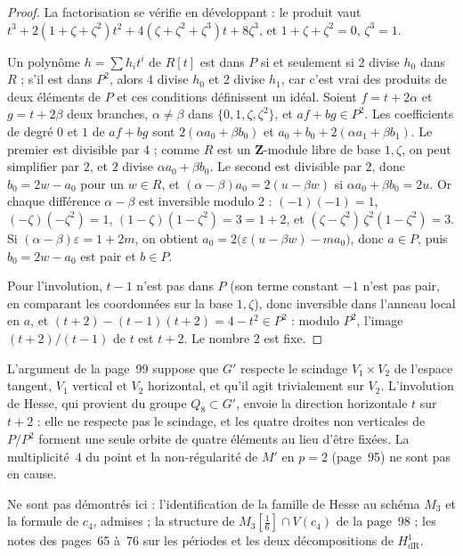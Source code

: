 \begin{proof}
La factorisation se vérifie en développant : le produit vaut $t^3 + 2(1 + \zeta + \zeta^2)t^2 + 4(\zeta + \zeta^2 + \zeta^3)t + 8\zeta^3$, et $1 + \zeta + \zeta^2 = 0$, $\zeta^3 = 1$.

Un polynôme $h = \sum h_i t^i$ de $R[t]$ est dans $P$ si et seulement si $2$ divise $h_0$ dans $R$ ; s'il est dans $P^2$, alors $4$ divise $h_0$ et $2$ divise $h_1$, car c'est vrai des produits de deux éléments de $P$ et ces conditions définissent un idéal. Soient $f = t + 2\alpha$ et $g = t + 2\beta$ deux branches, $\alpha \neq \beta$ dans $\{0, 1, \zeta, \zeta^2\}$, et $af + bg \in P^2$. Les coefficients de degré $0$ et $1$ de $af + bg$ sont $2(\alpha a_0 + \beta b_0)$ et $a_0 + b_0 + 2(\alpha a_1 + \beta b_1)$. Le premier est divisible par $4$ ; comme $R$ est un $\mathbf Z$-module libre de base $1, \zeta$, on peut simplifier par $2$, et $2$ divise $\alpha a_0 + \beta b_0$. Le second est divisible par $2$, donc $b_0 = 2w - a_0$ pour un $w \in R$, et $(\alpha - \beta) a_0 = 2(u - \beta w)$ si $\alpha a_0 + \beta b_0 = 2u$. Or chaque différence $\alpha - \beta$ est inversible modulo $2$ : $(-1)(-1) = 1$, $(-\zeta)(-\zeta^2) = 1$, $(1 - \zeta)(1 - \zeta^2) = 3 = 1 + 2$, et $(\zeta - \zeta^2)\,\zeta^2(1 - \zeta^2) = 3$. Si $(\alpha - \beta)\varepsilon = 1 + 2m$, on obtient $a_0 = 2\bigl(\varepsilon(u - \beta w) - m a_0\bigr)$, donc $a \in P$, puis $b_0 = 2w - a_0$ est pair et $b \in P$.

Pour l'involution, $t - 1$ n'est pas dans $P$ (son terme constant $-1$ n'est pas pair, en comparant les coordonnées sur la base $1, \zeta$), donc inversible dans l'anneau local en $a$, et $(t + 2) - (t - 1)(t + 2) = 4 - t^2 \in P^2$ : modulo $P^2$, l'image $(t + 2)/(t - 1)$ de $t$ est $t + 2$. Le nombre $2$ est fixe.
\end{proof}

\begin{remarque}
L'argument de la page~99 suppose que $G'$ respecte le scindage $V_1 \times V_2$ de l'espace tangent, $V_1$ vertical et $V_2$ horizontal, et qu'il agit trivialement sur $V_2$. L'involution de Hesse, qui provient du groupe $Q_8 \subset G'$, envoie la direction horizontale $t$ sur $t + 2$ : elle ne respecte pas le scindage, et les quatre droites non verticales de $P/P^2$ forment une seule orbite de quatre éléments au lieu d'être fixées. La multiplicité~$4$ du point et la non-régularité de $M'$ en $p = 2$ (page~95) ne sont pas en cause.
\end{remarque}

Ne sont pas démontrés ici : l'identification de la famille de Hesse au schéma $M_3$ et la formule de $c_4$, admises ; la structure de $M_3[\frac16] \cap V(c_4)$ de la page~98 ; les notes des pages~65 à~76 sur les périodes et les deux décompositions de $H^1_{\mathrm{dR}}$.
